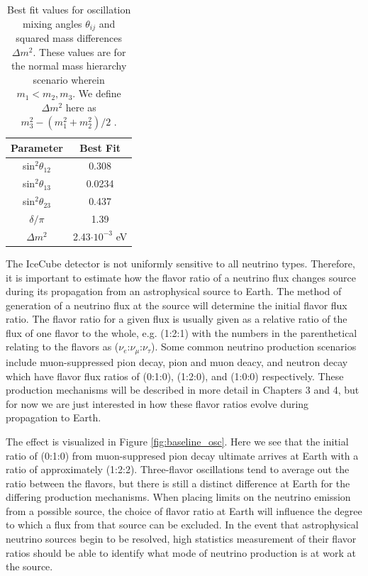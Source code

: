 \documentclass{gatech-thesis}
\begin{document}
\begin{table}[h]
\caption[Best Fit Neutrino Oscillation Parameters]{Best fit values for oscillation mixing angles $\theta_{ij}$ and squared mass differences $\Delta m^{2}$. These values are for the normal mass hierarchy scenario wherein $m_1 < m_2 , m_3$. We define $\Delta m^{2}$ here as $m_{3}^2 - (m_1^2 + m_2^2)/2$ \cite{PhysRevD.89.093018}.\label{tab:osc_param}}
\begin{center}
\begin{tabular}{cc}
\toprule
\textbf{Parameter} &\textbf{ Best Fit}\\
\midrule
sin$^2 \theta_{12}$ & 0.308\\
sin$^2 \theta_{13}$ & 0.0234\\
sin$^2 \theta_{23}$ & 0.437\\
$\delta / \pi$ & 1.39 \\
$\Delta m^2$ & 2.43$\cdot 10^{-3}$ eV\\
\hline
\end{tabular}
\end{center}
\end{table}

The IceCube detector is not uniformly sensitive to all neutrino types. Therefore, it is important to estimate how the flavor ratio of a neutrino flux changes source during its propagation from an astrophysical source to Earth. The method of generation of a neutrino flux at the source will determine the initial flavor flux ratio. The flavor ratio for a given flux is usually given as a relative ratio of the flux of one flavor to the whole, e.g. (1:2:1) with the numbers in the parenthetical relating to the flavors as ($\nu_e$:$\nu_{\mu}$:$\nu_{\tau}$). Some common neutrino production scenarios include muon-suppressed pion decay, pion and muon deacy, and neutron decay which have flavor flux ratios of (0:1:0), (1:2:0), and (1:0:0) respectively. These production mechanisms will be described in more detail in Chapters 3 and 4, but for now we are just interested in how these flavor ratios evolve during propagation to Earth. 

The effect is visualized in Figure \ref{fig:baseline_osc}. Here we see that the initial ratio of (0:1:0) from muon-suppresed pion decay ultimate arrives at Earth with a ratio of approximately (1:2:2). Three-flavor oscillations tend to average out the ratio between the flavors, but there is still a distinct difference at Earth for the differing production mechanisms. When placing limits on the neutrino emission from a possible source, the choice of flavor ratio at Earth will influence the degree to which a flux from that source can be excluded. In the event that astrophysical neutrino sources begin to be resolved, high statistics measurement of their flavor ratios should be able to identify what mode of neutrino production is at work at the source.
\end{document}
